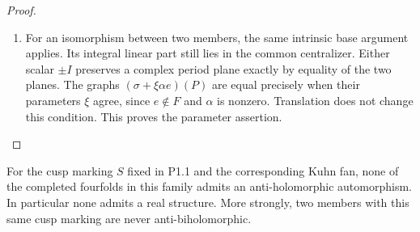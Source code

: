\begin{proof}
\begin{enumerate}[label=\arabic*.]
\item For an isomorphism between two members, the same intrinsic
base argument applies. Its integral linear part still
lies in the common centralizer. Either scalar $\pm I$
preserves a complex period plane exactly by equality
of the two planes. The graphs
$(\sigma+\xi\alpha e)(P)$ are equal precisely when their
parameters $\xi$ agree, since $e\notin F$ and $\alpha$
is nonzero. Translation does not change this condition.
This proves the parameter assertion.

\end{enumerate}
\end{proof}




\begin{theorem}\label{night:P1.17}
For the cusp marking $S$ fixed in P1.1 and the corresponding Kuhn fan,
none of the completed fourfolds in this family admits an
anti-holomorphic automorphism.  In particular none admits a real
structure.  More strongly, two members with this same cusp marking
are never anti-biholomorphic.
\end{theorem}

